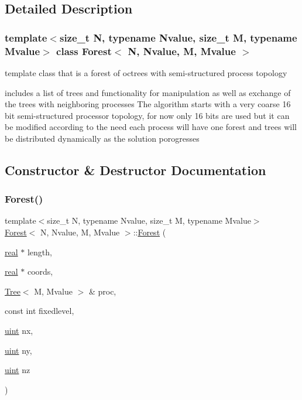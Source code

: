 \subsection{Detailed Description}
\subsubsection*{template$<$size\+\_\+t N, typename Nvalue, size\+\_\+t M, typename Mvalue$>$\newline
class Forest$<$ N, Nvalue, M, Mvalue $>$}

template class that is a forest of octrees with semi-\/structured process topology 

includes a list of tree\textquotesingle{}s and functionality for manipulation as well as exchange of the trees with neighboring processes The algorithm starts with a very coarse 16 bit semi-\/structured processor topology, for now only 16 bits are used but it can be modified according to the need each process will have one forest and trees will be distributed dynamically as the solution porogresses 

\subsection{Constructor \& Destructor Documentation}
\mbox{\label{classForest_aacc8ee76a6986596ccd704f6aee9832f}} 
\subsubsection{\texorpdfstring{Forest()}{Forest()}}
{\footnotesize\ttfamily template$<$size\+\_\+t N, typename Nvalue, size\+\_\+t M, typename Mvalue$>$ \\
\mbox{\hyperlink{classForest}{Forest}}$<$ N, Nvalue, M, Mvalue $>$\+::\mbox{\hyperlink{classForest}{Forest}} (\begin{DoxyParamCaption}\item[{\mbox{\hyperlink{definitions_8h_aedc0ad84d1e764530814f57ad931d02a}{real}} $\ast$}]{length,  }\item[{\mbox{\hyperlink{definitions_8h_aedc0ad84d1e764530814f57ad931d02a}{real}} $\ast$}]{coords,  }\item[{\mbox{\hyperlink{classTree}{Tree}}$<$ M, Mvalue $>$ \&}]{proc,  }\item[{const int}]{fixedlevel,  }\item[{\mbox{\hyperlink{definitions_8h_a69aa29b598b851b0640aa225a9e5d61d}{uint}}}]{nx,  }\item[{\mbox{\hyperlink{definitions_8h_a69aa29b598b851b0640aa225a9e5d61d}{uint}}}]{ny,  }\item[{\mbox{\hyperlink{definitions_8h_a69aa29b598b851b0640aa225a9e5d61d}{uint}}}]{nz }\end{DoxyParamCaption})}

